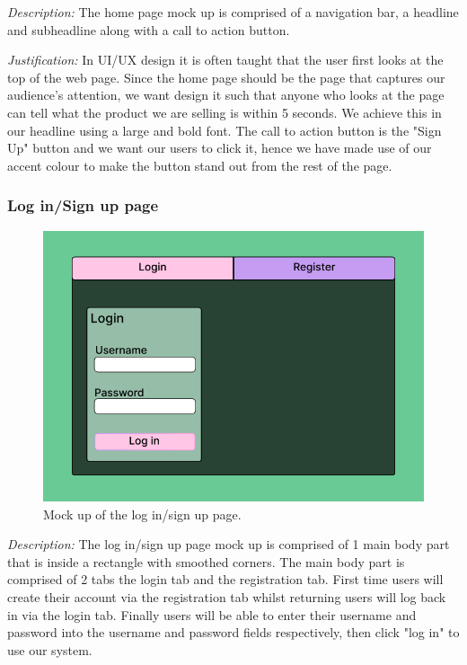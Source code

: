 \textit{Description:}
The home page mock up is comprised of a navigation bar, a 
headline and subheadline along with a call to action button.
\\ \vspace{0.2cm}

\textit{Justification:}
In UI/UX design it is often taught that the user first looks 
at the top of the web page. Since the home page should be the 
page that captures our audience's attention, we want design 
it such that anyone who looks at the page can tell what the 
product we are selling is within 5 seconds. We achieve this 
in our headline using a large and bold font. The call to
action button is the "Sign Up" button and we want our users 
to click it, hence we have made use of our accent colour to 
make the button stand out from the rest of the page.\\

\subsubsection{Log in/Sign up page}

\begin{figure}[H]
\centering

\includegraphics[scale=0.2]{Images/Login_Page_1.png}

\caption{Mock up of the log in/sign up page.}
\label{fig:login}
\end{figure}

\textit{Description:}
The log in/sign up page mock up is comprised of 1 main
body part that is inside a rectangle with smoothed corners.
The main body part is comprised of 2 tabs the login tab and
the registration tab. First time users will create their 
account via the registration tab whilst returning users will
log back in via the login tab. Finally users will be able to 
enter their username and password into the username and 
password fields respectively, then click "log in" to use our
system.
\\ \vspace{0.2cm}


